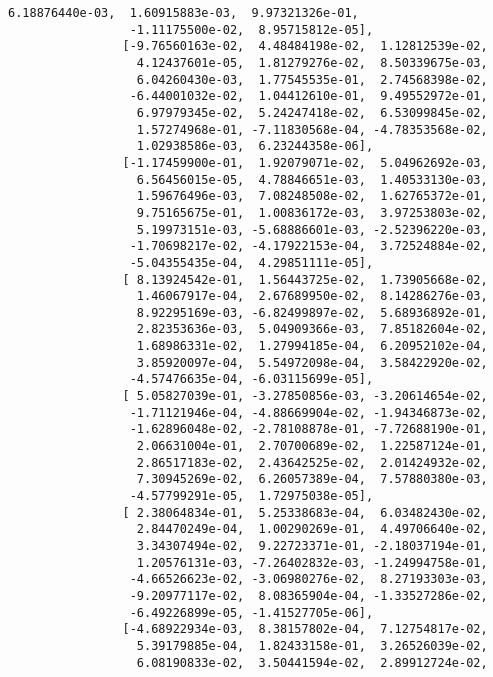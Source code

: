 \documentclass[11pt]{article}
\begin{document}
\begin{Verbatim}[commandchars=\\\{\}]
                  6.18876440e-03,  1.60915883e-03,  9.97321326e-01,
                 -1.11175500e-02,  8.95715812e-05],
                [-9.76560163e-02,  4.48484198e-02,  1.12812539e-02,
                  4.12437601e-05,  1.81279276e-02,  8.50339675e-03,
                  6.04260430e-03,  1.77545535e-01,  2.74568398e-02,
                 -6.44001032e-02,  1.04412610e-01,  9.49552972e-01,
                  6.97979345e-02,  5.24247418e-02,  6.53099845e-02,
                  1.57274968e-01, -7.11830568e-04, -4.78353568e-02,
                  1.02938586e-03,  6.23244358e-06],
                [-1.17459900e-01,  1.92079071e-02,  5.04962692e-03,
                  6.56456015e-05,  4.78846651e-03,  1.40533130e-03,
                  1.59676496e-03,  7.08248508e-02,  1.62765372e-01,
                  9.75165675e-01,  1.00836172e-03,  3.97253803e-02,
                  5.19973151e-03, -5.68886601e-03, -2.52396220e-03,
                 -1.70698217e-02, -4.17922153e-04,  3.72524884e-02,
                 -5.04355435e-04,  4.29851111e-05],
                [ 8.13924542e-01,  1.56443725e-02,  1.73905668e-02,
                  1.46067917e-04,  2.67689950e-02,  8.14286276e-03,
                  8.92295169e-03, -6.82499897e-02,  5.68936892e-01,
                  2.82353636e-03,  5.04909366e-03,  7.85182604e-02,
                  1.68986331e-02,  1.27994185e-04,  6.20952102e-04,
                  3.85920097e-04,  5.54972098e-04,  3.58422920e-02,
                 -4.57476635e-04, -6.03115699e-05],
                [ 5.05827039e-01, -3.27850856e-03, -3.20614654e-02,
                 -1.71121946e-04, -4.88669904e-02, -1.94346873e-02,
                 -1.62896048e-02, -2.78108878e-01, -7.72688190e-01,
                  2.06631004e-01,  2.70700689e-02,  1.22587124e-01,
                  2.86517183e-02,  2.43642525e-02,  2.01424932e-02,
                  7.30945269e-02,  6.26057389e-04,  7.57880380e-03,
                 -4.57799291e-05,  1.72975038e-05],
                [ 2.38064834e-01,  5.25338683e-04,  6.03482430e-02,
                  2.84470249e-04,  1.00290269e-01,  4.49706640e-02,
                  3.34307494e-02,  9.22723371e-01, -2.18037194e-01,
                  1.20576131e-03, -7.26402832e-03, -1.24994758e-01,
                 -4.66526623e-02, -3.06980276e-02,  8.27193303e-03,
                 -9.20977117e-02,  8.08365904e-04, -1.33527286e-02,
                 -6.49226899e-05, -1.41527705e-06],
                [-4.68922934e-03,  8.38157802e-04,  7.12754817e-02,
                  5.39179885e-04,  1.82433158e-01,  3.26526039e-02,
                  6.08190833e-02,  3.50441594e-02,  2.89912724e-02,

\end{Verbatim}
\end{document}
